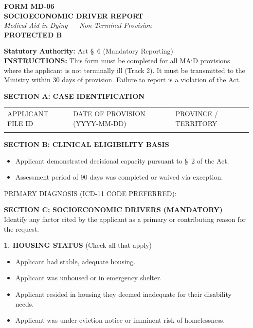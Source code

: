 \documentclass[11pt]{article}
\begin{document}
\begin{center}
    \textbf{\Large FORM MD-06}\\[0.5em]
    \textbf{\Large SOCIOECONOMIC DRIVER REPORT}\\[0.2em]
    \textit{Medical Aid in Dying --- Non-Terminal Provision}\\[0.2em]
    \textbf{PROTECTED B}
\end{center}

\vspace{0.5em}
\noindent\textbf{Statutory Authority:} Act \S~6 (Mandatory Reporting)\\[0.5em]
\noindent\textbf{INSTRUCTIONS:} This form must be completed for all MAiD provisions where the applicant is not terminally ill (Track 2). It must be transmitted to the Ministry within 30 days of provision. Failure to report is a violation of the Act.

\vspace{1em}
\noindent\textbf{\large SECTION A: CASE IDENTIFICATION}
\vspace{0.5em}\\
\noindent\begin{tabularx}{\textwidth}{|X|X|X|}
\hline
APPLICANT FILE ID & DATE OF PROVISION (YYYY-MM-DD) & PROVINCE / TERRITORY \\
\vspace{1.5em} & \vspace{1.5em} & \vspace{1.5em} \\
\hline
\end{tabularx}

\vspace{1em}
\noindent\textbf{\large SECTION B: CLINICAL ELIGIBILITY BASIS}
\begin{itemize}
    \item[$\square$] Applicant demonstrated decisional capacity pursuant to \S~2 of the Act.
    \item[$\square$] Assessment period of 90 days was completed or waived via exception.
\end{itemize}
\noindent PRIMARY DIAGNOSIS (ICD-11 CODE PREFERRED): \hrulefill

\vspace{1em}
\noindent\textbf{\large SECTION C: SOCIOECONOMIC DRIVERS (MANDATORY)}\\[0.2em]
Identify any factor cited by the applicant as a primary or contributing reason for the request.

\vspace{0.5em}
\noindent\textbf{1. HOUSING STATUS} (Check all that apply)
\begin{itemize}
    \item[$\square$] Applicant had stable, adequate housing.
    \item[$\square$] Applicant was unhoused or in emergency shelter.
    \item[$\square$] Applicant resided in housing they deemed inadequate for their disability needs.
    \item[$\square$] Applicant was under eviction notice or imminent risk of homelessness.
\end{itemize}
\end{document}
